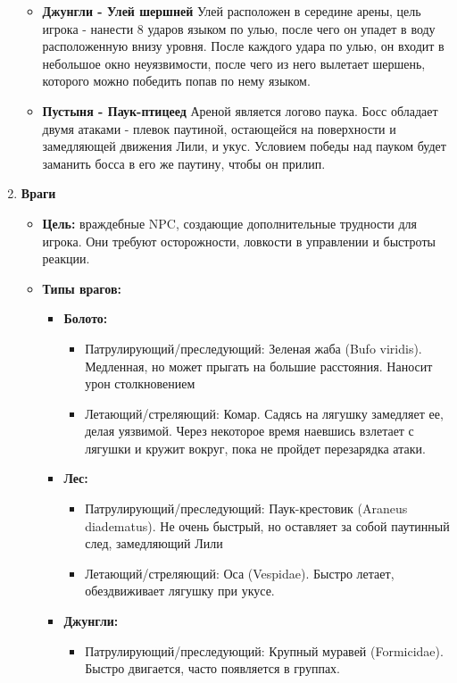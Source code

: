 \documentclass{article}
\begin{document}
\begin{enumerate}
\begin{itemize}
     \item \textbf{Джунгли - Улей шершней} Улей расположен в середине арены, цель игрока - нанести 8 ударов языком по улью, после чего он упадет в воду расположенную внизу уровня. После каждого удара по улью, он входит в небольшое окно неуязвимости, после чего из него вылетает шершень, которого можно победить попав по нему языком.
     \item \textbf{Пустыня - Паук-птицеед} Ареной является логово паука. Босс обладает двумя атаками - плевок паутиной, остающейся на поверхности и замедляющей движения Лили, и укус. Условием победы над пауком будет заманить босса в его же паутину, чтобы он прилип.
     \end {itemize}
\item \textbf{Враги}
    \begin{itemize}
    \item \textbf{Цель: }враждебные NPC, создающие дополнительные трудности для игрока. Они требуют осторожности, ловкости в управлении и быстроты реакции.
    \item \textbf{Типы врагов:}
    \begin{itemize}
            \item \textbf{Болото:}
            \begin{itemize}
                \item Патрулирующий/преследующий: Зеленая жаба (Bufo viridis). Медленная, но может прыгать на большие расстояния. Наносит урон столкновением
                \item Летающий/стреляющий: Комар. Садясь на лягушку замедляет ее, делая уязвимой. Через некоторое время наевшись взлетает с лягушки и кружит вокруг, пока не пройдет перезарядка атаки.
            \end {itemize}
            \item \textbf{Лес:}
            \begin{itemize}
                \item Патрулирующий/преследующий: Паук-крестовик (Araneus diadematus). Не очень быстрый, но оставляет за собой паутинный след, замедляющий Лили
                \item Летающий/стреляющий: Оса (Vespidae). Быстро летает, обездвиживает лягушку при укусе.
            \end {itemize}
            \item \textbf{Джунгли:}
            \begin{itemize}
                \item Патрулирующий/преследующий: Крупный муравей (Formicidae). Быстро двигается, часто появляется в группах.

\end{itemize}
\end{itemize}
\end{itemize}
\end{enumerate}
\end{document}
